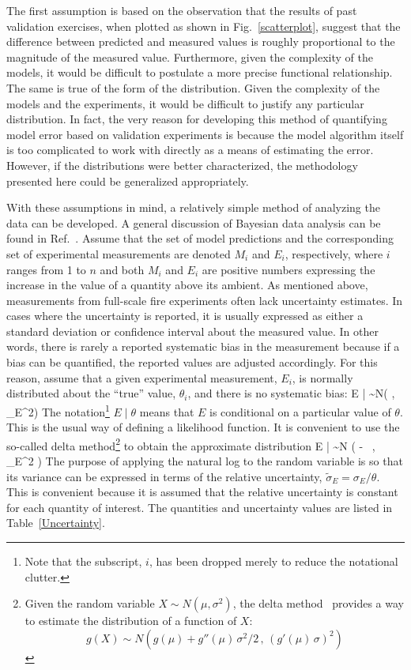 The first assumption is based on the observation that the results of past validation exercises,
when plotted as shown in Fig.~\ref{scatterplot}, suggest
that the difference between predicted and measured values is roughly proportional to the magnitude of the measured value.
Furthermore, given the
complexity of the models, it would be difficult to postulate a more precise functional relationship.
The same is true of the form of the distribution. Given the complexity of the models and the experiments,
it would be difficult to justify
any particular distribution. In fact, the very reason for developing this method of quantifying model
error based on validation
experiments is because the model algorithm itself is too complicated to work with directly
as a means of estimating the error. However, if
the distributions were better characterized, the methodology presented here could be generalized appropriately.

With these assumptions in mind, a relatively simple method of analyzing the data can be developed.
A general discussion of Bayesian data analysis can be found in
Ref.~\cite{Gelman:Stats}.
Assume that the set of model predictions and the corresponding set of experimental measurements are denoted
$M_i$ and $E_i$, respectively, where $i$ ranges from 1 to $n$ and both $M_i$ and $E_i$ are positive numbers
expressing the increase in the value of a quantity above its ambient.
As mentioned above, measurements from full-scale fire experiments often lack uncertainty estimates. In cases where the uncertainty is
reported, it is usually expressed as either a standard deviation or confidence interval about the measured value. In other words, there is rarely
a reported systematic bias in the measurement because if a bias can be quantified, the reported values are adjusted accordingly.
For this reason, assume that a given experimental measurement, $E_i$, is normally
distributed about the ``true'' value, $\theta_i$, and there is no systematic bias:
\be
   E \; | \; \theta \sim N(\theta \; , \; \sigma_E^2) \label{expunc}
\ee
The notation\footnote{Note that the subscript, $i$, has been dropped merely to reduce the notational clutter.}
$E \; | \; \theta$ means that $E$ is conditional on a particular value of $\theta$.
This is the usual way of defining a likelihood function.
It is convenient to use the so-called delta method\footnote{Given the random variable $X \sim N(\mu,\sigma^2)$, the
delta method~\cite{Oehlert:1992} provides a way to estimate the distribution of a function of $X$:
$$g(X) \sim N \left( g(\mu) + g''(\mu) \, \sigma^2/2 \, , \, (g'(\mu) \, \sigma)^2\right)$$} to obtain the approximate distribution
\be
   \ln E \; | \; \theta \sim N \left( \ln \theta -  \, , \,\widetilde{\sigma}_E^2 \right) \label{eeq}
\ee
The purpose of applying the natural log to the random variable is so that its variance can be expressed in terms of the
relative uncertainty, $\widetilde{\sigma}_E=\sigma_E/\theta$. This is convenient because it is assumed that the relative
uncertainty is constant for each quantity of interest. The quantities and uncertainty values are listed in Table~\ref{Uncertainty}.

